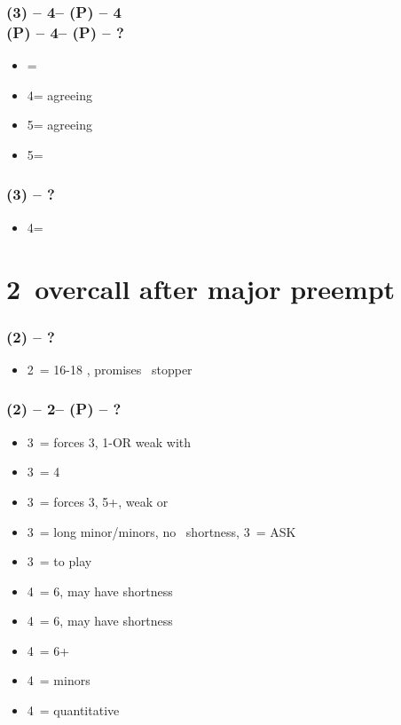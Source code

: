 \subsubsection*{(3\clubs) -- 4\clubs -- (P) -- 4\diams
                \\(P) -- 4\spades -- (P) -- ?}
\begin{itemize}
    \item \pass = \soff
    \item 4\nt = agreeing \diams
    \item 5\clubs = agreeing \spades
    \item 5\diams = \soff
\end{itemize}

\subsubsection*{(3\diams) -- ?}
\begin{itemize}
    \item 4\clubs = \nat \imp
\end{itemize}

\section{\texorpdfstring{2\ntx\ overcall after major preempt}{preempt2nt}}\label{sec:preempt2nt}

\subsubsection*{(2\major) -- ?}
\begin{itemize}
    \item 2\nt\ = 16-18 \bal, promises \major\ stopper
\end{itemize}

\subsubsection*{(2\hearts) -- 2\nt -- (P) -- ?}
\begin{itemize}
    \item 3\clubs\ = forces 3\diams, 1-\hearts \gf OR weak with \diams
    \item 3\diams\ = 4\spades \gf
    \item 3\hearts\ = forces 3\spades, 5+\spades, weak or \gf
    \item 3\spades\ = long minor/minors, no \hearts\ shortness, 3\nt\ = ASK
    \item 3\nt\ = to play
    \item 4\clubs\ = 6\spades, may have shortness
    \item 4\diams\ = 6\spades, may have shortness
    \item 4\hearts\ = 6+\spades
    \item 4\spades\ = minors
    \item 4\nt\ = quantitative
\end{itemize}


